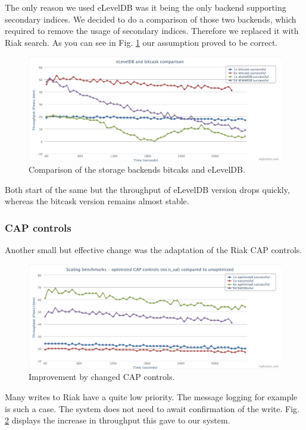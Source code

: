 \documentclass[11pt,a4paper]{report}
\begin{document}
The only reason we used eLevelDB was it being the only backend supporting secondary indices.
We decided to do a comparison of those two backends,
which required to remove the usage of secondary indices.
Therefore we replaced it with Riak search.
As you can see in Fig. \ref{fig:load_test:degradation_compare} our assumption proved to be correct.
\begin{figure}[htbp!]
 \hspace{-2.5cm}
 \includegraphics[width=18cm]{./graphics/Load_test-degradation_compare.pdf}
 \caption{Comparison of the storage backends bitcaks and eLevelDB.}
 \label{fig:load_test:degradation_compare}
\end{figure}
Both start of the same but the throughput of eLevelDB version drops quickly,
whereas the bitcask version remains almost stable.

\subsubsection{CAP controls}
Another small but effective change was the adaptation of the Riak CAP controls.
\begin{figure}[htbp!]
 \hspace{-2.5cm}
 \includegraphics[width=18cm]{./graphics/Load_test-cap.pdf}
 \caption{Improvement by changed CAP controls.}
 \label{fig:load_test:cap}
\end{figure}
Many writes to Riak have a quite low priority.
The message logging for example is such a case.
The system does not need to await confirmation of the write.
Fig. \ref{fig:load_test:cap} displays the increase in throughput this gave to our system.
\end{document}

